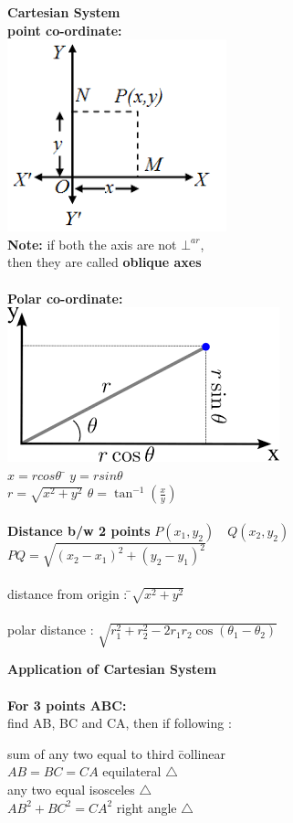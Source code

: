 \documentclass[11pt,a4paper,landscape]{article}
\begin{document}
\begin{multicols*}{3}


\begin{tabbing}
{\bfseries {\Large Cartesian System}}\\
{\bfseries  point co-ordinate:} \\
\includegraphics[scale=0.4]{point}\\

{\bfseries  Note:} if both the axis are not ${\bot}^{ar}$,\\ then they are called {\bfseries  oblique axes}\\\\
{\bfseries  Polar co-ordinate:} \\
\includegraphics [scale=0.4]{cordinate}\\
$ x= rcos\theta$ \hspace{15mm} \= $y=rsin\theta$\\
$r=\sqrt{x^2+y^2}$ \> $\theta=\tan^{-1} \left ( \frac{x}{y} \right )$\\ \\
{\bfseries  Distance b/w 2 points } $P(x_1,y_2) \quad Q(x_2,y_2)$\\
$PQ = \sqrt{{(x_2-x_1)}^2 + {(y_2-y_1)}^2}$\\ \\
distance from origin : \=$\sqrt{x^2 + y^2}$\\ \\
polar distance : $\sqrt{r_1^2 + r_2^2 - 2 r_1 r_2 \cos (\theta_1 - \theta_2)}$
\end{tabbing}
{\bfseries{\Large Application of Cartesian System}}\\ \\
{\bfseries  For 3 points ABC:} \\
find AB, BC and CA, then if following :
\begin{tabbing}
sum of any two equal to third \hspace{10mm} \= collinear\\
$AB = BC = CA$ \> equilateral $\triangle$\\
any two equal \> isosceles $\triangle$\\
$AB^2 + BC^2 = CA^2$ \> right angle $\triangle$\\


\end{tabbing}
\end{multicols*}
\end{document}
